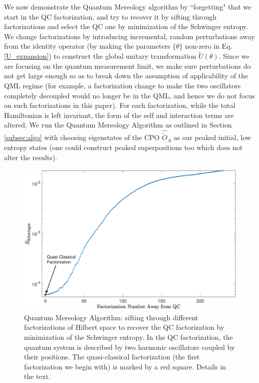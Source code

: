 \documentclass[aps,pra,onecolumn,nofootinbib,notitlepage,11pt,tightenlines]{revtex4-1}
\begin{document}
We now demonstrate the Quantum Mereology algorithm by ``forgetting" that we start in the QC factorization, and try to recover it by sifting through factorizations and select the QC one by minimization of the Schwinger entropy. We change factorizations by introducing incremental, random perturbations away from the identity operator (by making the parameters $\{\theta\}$ non-zero in Eq. \ref{U_expansion}) to construct the global unitary transformation $\tilde{U}(\theta)$. 
Since we are focusing on the quantum measurement limit, we make sure perturbations do not get large enough so as to break down the assumption of applicability of the QML regime (for example, a factorization change to make the two oscillators completely decoupled would no longer be in the QML, and hence we do not focus on such factorizations in this paper). For each factorization, while the total Hamiltonian is left invariant, the form of the self and interaction terms are altered. We run the Quantum Mereology Algorithm as outlined in Section \ref{subsec:algo} with choosing eigenstates of the CPO $\hat{\tilde{O}}_{A}$ as our peaked initial, low entropy states (one could construct peaked superpositions too which does not alter the results).

 \begin{figure}[h]
\includegraphics[width=.68\textwidth]{mereo_1.eps}
\caption{Quantum Mereology Algorithm: sifting through different factorizations of Hilbert space to recover the QC factorization by minimization of the Schwinger entropy. In the QC factorization, the quantum system is described by two harmonic oscillators coupled by their positions. The quasi-classical factorization (the first factorization we begin with) is marked by a red square. Details in the text.}
\label{fig:mereo_1}
\end{figure}
\end{document}

